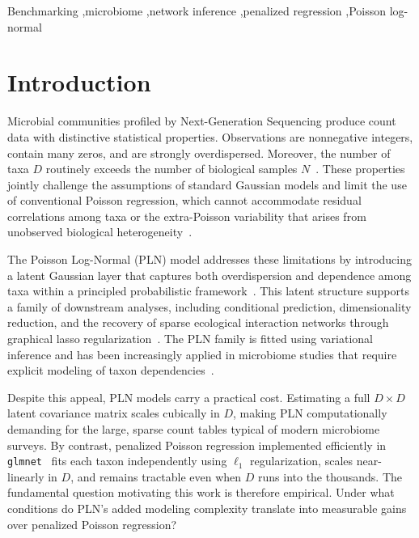 \documentclass[a4paper,fleqn,longmktitle]{cas-sc}
\begin{document}
\begin{keywords}
Benchmarking \sep microbiome \sep network inference \sep penalized regression \sep Poisson log-normal
\end{keywords}

\maketitle

\section{Introduction}
Microbial communities profiled by Next-Generation Sequencing produce count data with distinctive statistical properties.
Observations are nonnegative integers, contain many zeros, and are strongly overdispersed.   
Moreover, the number of taxa $D$ routinely exceeds the number of biological samples $N$~\citep{Kodikara2022}.
These properties jointly challenge the assumptions of standard Gaussian models and limit the use of conventional Poisson regression, which cannot accommodate residual correlations among taxa or the extra-Poisson variability that arises from unobserved biological heterogeneity~\citep{mcmurdie2014waste, Chiquet2021}.

The Poisson Log-Normal (PLN) model addresses these limitations by introducing a latent Gaussian layer that captures both overdispersion and dependence among taxa within a principled probabilistic framework~\citep{aitchison1989multivariate, Chiquet2021}.
This latent structure supports a family of downstream analyses, including conditional prediction, dimensionality reduction, and the recovery of sparse ecological interaction networks through graphical lasso regularization~\citep{chiquet2019variational}.
The PLN family is fitted using variational inference and has been increasingly applied in microbiome studies that require explicit modeling of taxon dependencies~\citep{Chiquet2021, SUBEDI20251255}.

Despite this appeal, PLN models carry a practical cost.
Estimating a full $D \times D$ latent covariance matrix scales cubically in $D$, making PLN computationally demanding for the large, sparse count tables typical of modern microbiome surveys.
By contrast, penalized Poisson regression implemented efficiently in \texttt{glmnet}~\citep{Friedman2010} fits each taxon independently using $\ell_1$ regularization, scales near-linearly in $D$, and remains tractable even when $D$ runs into the thousands.
The fundamental question motivating this work is therefore empirical.
Under what conditions do PLN's added modeling complexity translate into measurable gains over penalized Poisson regression?
\end{document}
